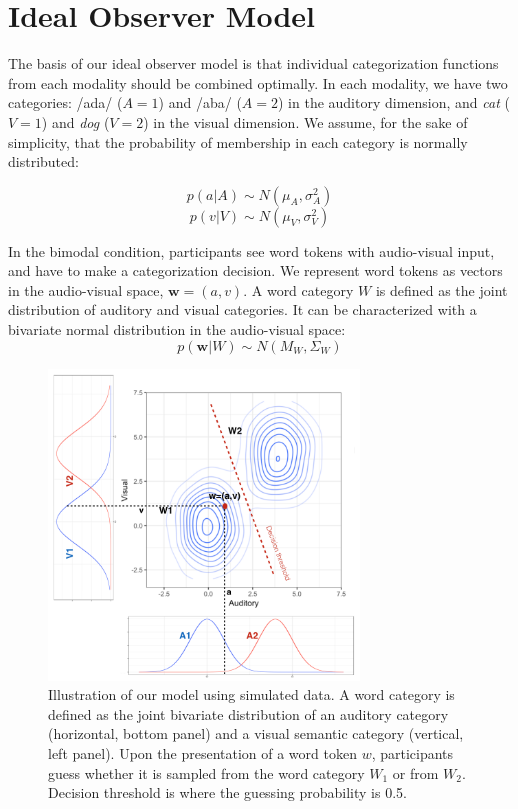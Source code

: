 \documentclass[10pt,letterpaper]{article}
\begin{document}
\section{Ideal Observer Model}

The basis of our ideal observer model is that individual categorization functions from each modality should be combined optimally.
In each modality, we have two categories: /ada/ ($A=1$) and /aba/ ($A=2$) in the auditory dimension, and \textit{cat} ($V=1$) and \textit{dog} ($V=2$) in the visual dimension.
We assume, for the sake of simplicity, that the probability of membership in each category is normally distributed:

$$ p(a | A) \sim  N(\mu_A, \sigma^2_A) $$
$$ p(v | V) \sim  N(\mu_V, \sigma^2_V) $$

In the bimodal condition, participants see word tokens with audio-visual input, and have to make a categorization decision. We represent word tokens as vectors in the audio-visual space, $\mathbf{w}=(a,v)$.
A word category $W$ is defined as the joint distribution of auditory and visual categories. It can be characterized with a bivariate normal distribution in the audio-visual space:
$$ p(\mathbf{w} | W) \sim  N(M_W, \Sigma_W) $$

\begin{figure}[tp]
  \centering
  \includegraphics[width=3.25in]{MyTask.png}
  \caption{Illustration of our model using simulated data. A word category is defined as the joint bivariate distribution of an auditory category (horizontal, bottom panel) and a visual semantic category (vertical, left panel). Upon the presentation of a word token $w$, participants guess whether it is sampled from the word category $W_1$ or from $W_2$. Decision threshold is where the guessing probability is 0.5.}
  \label{fig:space}
\end{figure}
\end{document}
